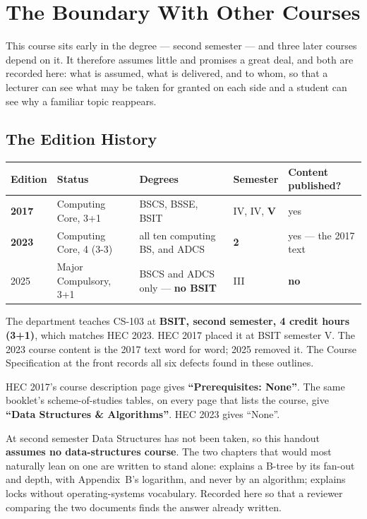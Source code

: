 \chapter{The Boundary With Other Courses}\label{app:boundary}
\normalfigures

This course sits early in the degree --- second semester --- and three later
courses depend on it. It therefore assumes little and promises a great deal,
and both are recorded here: what is assumed, what is delivered, and to whom,
so that a lecturer can see what may be taken for granted on each side and a
student can see why a familiar topic reappears.

\section{The Edition History}

\begin{longtable}{@{}L{1.5cm}L{3.1cm}L{3.8cm}L{1.9cm}L{3.0cm}@{}}
\toprule
{}
\textbf{Edition} & \textbf{Status} & \textbf{Degrees} & \textbf{Semester}
& \textbf{Content published?} \\
\midrule
\endhead
\textbf{2017} & Computing Core, 3+1 & BSCS, BSSE, BSIT & IV, IV, \textbf{V}
  & yes \\
\textbf{2023} & Computing Core, 4 (3-3) & all ten computing BS, and ADCS &
  \textbf{2} & yes --- the 2017 text \\
2025 & Major Compulsory, 3+1 & BSCS and ADCS only --- \textbf{no BSIT} & III
  & \textbf{no} \\
\bottomrule
\end{longtable}

\smallskip
The department teaches CS-103 at \textbf{BSIT, second semester, 4 credit hours
(3+1)}, which matches HEC 2023. HEC 2017 placed it at BSIT semester V. The 2023
course content is the 2017 text word for word; 2025 removed it. The Course
Specification at the front records all six defects found in these outlines.

\begin{alertbox}
HEC 2017's course description page gives \textbf{``Prerequisites: None''}.
The same booklet's scheme-of-studies tables, on every page that lists the
course, give \textbf{``Data Structures \& Algorithms''}. HEC 2023 gives
``None''.

\smallskip
At second semester Data Structures has not been taken, so this handout
\textbf{assumes no data-structures course}. The two chapters that would most
naturally lean on one are written to stand alone:  explains a
B-tree by its fan-out and depth, with Appendix~B's logarithm, and never by an
algorithm;  explains locks without operating-systems
vocabulary. Recorded here so that a reviewer comparing the two documents finds
the answer already written.
\end{alertbox}

